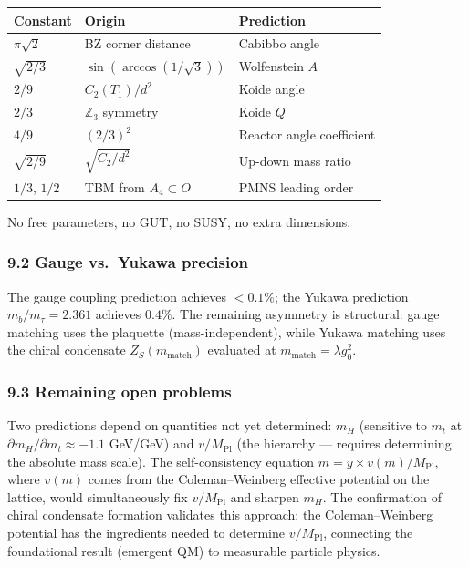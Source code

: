 \documentclass[
  11pt,
]{article}
\begin{document}
\begin{longtable}[]{@{}lll@{}}
\toprule\noalign{}
Constant & Origin & Prediction \\
\midrule\noalign{}
\endhead
\bottomrule\noalign{}
\endlastfoot
\(\pi\sqrt{2}\) & BZ corner distance & Cabibbo angle \\
\(\sqrt{2/3}\) & \(\sin(\arccos(1/\sqrt{3}))\) & Wolfenstein \(A\) \\
\(2/9\) & \(C_2(T_1)/d^2\) & Koide angle \\
\(2/3\) & \(\mathbb{Z}_3\) symmetry & Koide \(Q\) \\
\(4/9\) & \((2/3)^2\) & Reactor angle coefficient \\
\(\sqrt{2/9}\) & \(\sqrt{C_2/d^2}\) & Up-down mass ratio \\
\(1/3\), \(1/2\) & TBM from \(A_4 \subset O\) & PMNS leading order \\
\end{longtable}

No free parameters, no GUT, no SUSY, no extra dimensions.

\hypertarget{gauge-vs.-yukawa-precision}{%
\subsubsection{9.2 Gauge vs.~Yukawa
precision}\label{gauge-vs.-yukawa-precision}}

The gauge coupling prediction achieves \(< 0.1\%\); the Yukawa
prediction \(m_b/m_\tau = 2.361\) achieves \(0.4\%\). The remaining
asymmetry is structural: gauge matching uses the plaquette
(mass-independent), while Yukawa matching uses the chiral condensate
\(Z_S(m_{\text{match}})\) evaluated at
\(m_{\text{match}} = \lambda g_0^2\).

\hypertarget{remaining-open-problems}{%
\subsubsection{9.3 Remaining open
problems}\label{remaining-open-problems}}

Two predictions depend on quantities not yet determined: \(m_H\)
(sensitive to \(m_t\) at \(\partial m_H/\partial m_t \approx -1.1\)
GeV/GeV) and \(v/M_{\text{Pl}}\) (the hierarchy --- requires determining
the absolute mass scale). The self-consistency equation
\(m = y \times v(m)/M_{\text{Pl}}\), where \(v(m)\) comes from the
Coleman--Weinberg effective potential on the lattice, would
simultaneously fix \(v/M_{\text{Pl}}\) and sharpen \(m_H\). The
confirmation of chiral condensate formation validates this approach: the
Coleman--Weinberg potential has the ingredients needed to determine
\(v/M_{\text{Pl}}\), connecting the foundational result (emergent QM) to
measurable particle physics.
\end{document}
